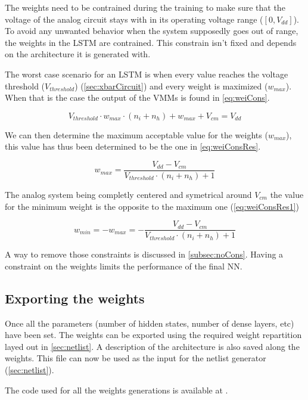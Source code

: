 The weights need to be contrained during the training to make sure that the voltage of the analog circuit stays with in its operating voltage range ($[0,V_{dd}]$). To avoid any unwanted behavior when the system supposedly goes out of range, the weights in the \ac{LSTM} are contrained. This constrain isn't fixed and depends on the architecture it is generated with.

The worst case scenario for an \ac{LSTM} is when every value reaches the voltage threshold ($V_{threshold}$) (\cref{sec:xbarCircuit}) and every weight is maximized ($w_{max}$). When that is the case the output of the \acp{VMM} is found in \cref{eq:weiCons}.

\begin{equation}\label{eq:weiCons}
  V_{threshold}\cdot w_{max} \cdot(n_i+n_h)+w_{max}+V_{cm}= V_{dd}
\end{equation}

We can then determine the maximum acceptable value for the weights ($w_{max}$), this value has thus been determined to be the one in \cref{eq:weiConsRes}.

\begin{equation}\label{eq:weiConsRes}
  w_{max}=\frac{V_{dd}-V_{cm}}{V_{threshold}\cdot(n_i+n_h)+1}
\end{equation}

The analog system being completly centered and symetrical around $V_{cm}$ the value for the minimum weight is the opposite to the maximum one (\cref{eq:weiConsRes1})

\begin{equation}\label{eq:weiConsRes1}
  w_{min}=-w_{max}=-\frac{V_{dd}-V_{cm}}{V_{threshold}\cdot(n_i+n_h)+1}
\end{equation}

A way to remove those constraints is discussed in \cref{subsec:noCons}. Having a constraint on the weights limits the performance of the final \ac{NN}.

\subsection{Exporting the weights}

Once all the parameters (number of hidden states, number of dense layers, etc) have been set. The weights can be exported using the required weight repartition layed out in \cref{sec:netlist}. A description of the architecture is also saved along the weights. This file can now be used as the input for the netlist generator (\cref{sec:netlist}).

The code used for all the weights generations is available at \cite{lstmWei}. %
